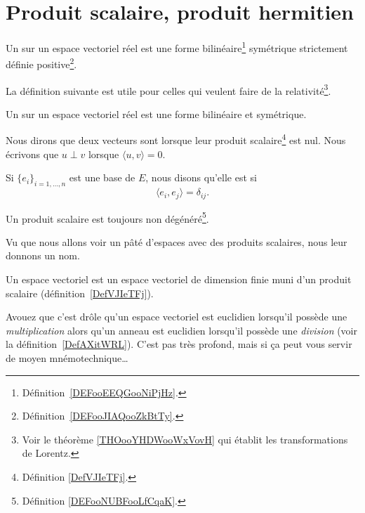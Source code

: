 \section{Produit scalaire, produit hermitien}

\begin{definition}\label{DefVJIeTFj}
	Un  sur un espace vectoriel réel est une forme bilinéaire\footnote{Définition~\ref{DEFooEEQGooNiPjHz}.} symétrique strictement définie positive\footnote{Définition~\ref{DEFooJIAQooZkBtTy}.}.
\end{definition}

La définition suivante est utile pour celles qui veulent faire de la relativité\footnote{Voir le théorème \ref{THOooYHDWooWxVovH} qui établit les transformations de Lorentz.}.
\begin{definition}      \label{DEFooLPBGooXLxubc}
	Un  sur un espace vectoriel réel est une forme bilinéaire et symétrique.
\end{definition}

\begin{definition}      \label{DEFooZBWTooIqXwRp}
	Nous dirons que deux vecteurs sont  lorsque leur produit scalaire\footnote{Définition \ref{DefVJIeTFj}.} est nul. Nous écrivons que \( u\perp v\) lorsque \( \langle u, v\rangle =0\).

	Si \( \{ e_i \}_{i=1,\ldots, n}\) est une base de \( E\), nous disons qu'elle est  si
	\begin{equation}
		\langle e_i, e_j\rangle =\delta_{ij}.
	\end{equation}
\end{definition}

\begin{lemma}       \label{LEMooLPUFooVCvnwW}
	Un produit scalaire est toujours non dégénéré\footnote{Définition \ref{DEFooNUBFooLfCqaK}.}.
\end{lemma}


Vu que nous allons voir un pâté d'espaces avec des produits scalaires, nous leur donnons un nom.
\begin{definition}\label{DefLZMcvfj}
	Un espace vectoriel  est un espace vectoriel de dimension finie muni d'un produit scalaire (définition~\ref{DefVJIeTFj}).
\end{definition}
Avouez que c'est drôle qu'un espace vectoriel est euclidien lorsqu'il possède une \emph{multiplication} alors qu'un anneau est euclidien lorsqu'il possède une \emph{division} (voir la définition~\ref{DefAXitWRL}). C'est pas très profond, mais si ça peut vous servir de moyen mnémotechnique\ldots

